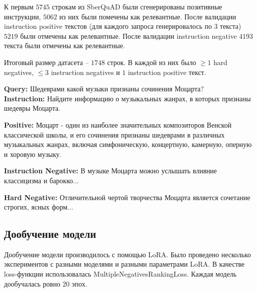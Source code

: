 \documentclass[12pt, a4paper, oneside]{article}
\begin{document}
К первым $5745$ строкам из SberQuAD были сгенерированы позитивные инструкции, 
$5062$ из них были помечены как релевантные. 
После валидации instruction positive текстов (для каждого запроса генерировалось по $3$ текста) 
$5219$ были отмечены как релевантные. После валидации instruction negative $4193$ текста были отмечены как релевантные. 

Итоговый размер датасета -- $1748$ строк. В каждой из них было $\ge 1$ hard negatives, $\le 3$ instruction negatives и 
$1$ instruction positive текст. 

\begin{datasetexample}
    \textbf{Query:} Шедеврами какой музыки признаны сочинения Моцарта? \\
    \textbf{Instruction:} Найдите информацию о музыкальных жанрах, в которых признаны шедевры Моцарта.
    
    \tcbline
    
    \textbf{Positive:} Моцарт - один из наиболее значительных композиторов Венской классической школы, и его сочинения признаны шедеврами в различных музыкальных жанрах, включая симфоническую, концертную, камерную, оперную и хоровую музыку.
    
    \medskip
    \textbf{Instruction Negative:} В музыке Моцарта можно услышать влияние классицизма и барокко...
    
    \medskip
    \textbf{Hard Negative:} Отличительной чертой творчества Моцарта является сочетание строгих, ясных форм...
\end{datasetexample}

\subsection{Дообучение модели}

Дообучение модели производилось с помощью LoRA. 
Было проведено несколько экспериментов с разными моделями и разными параметрами LoRA. 
В качестве loss-функции использовалась MultipleNegativesRankingLoss. 
Каждая модель дообучалась ровно $20$ эпох. 
\end{document}
